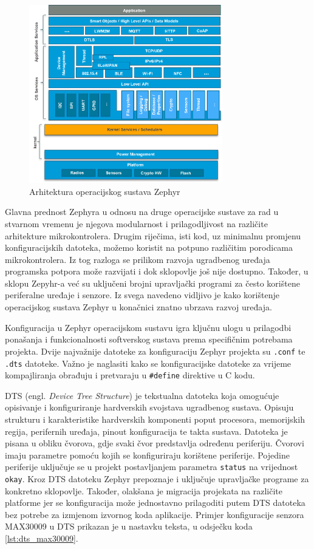 \documentclass[../diplomski_rad.tex]{subfiles}
\begin{document}
\begin{figure}[htb]
    \centering
    \includegraphics[width=0.75\textwidth]{Figures/zephyr.png} 
    \caption{Arhitektura operacijskog sustava Zephyr \cite{zephyr}}
    \label{slk:zephyr}
\end{figure}

Glavna prednost Zephyra u odnosu na druge operacijske sustave za rad u stvarnom vremenu je njegova 
modularnost i prilagodljivost na različite arhitekture mikrokontrolera. 
Drugim riječima, isti kod, uz minimalnu promjenu konfiguracijskih datoteka, možemo koristit na potpuno 
različitim porodicama mikrokontrolera. Iz tog razloga se prilikom razvoja ugradbenog uređaja programska 
potpora može razvijati i dok sklopovlje još nije dostupno.
Također, u sklopu Zepyhr-a već su uključeni brojni upravljački programi za često korištene periferalne 
uređaje i senzore. 
Iz svega navedeno vidljivo je kako korištenje operacijskog sustava Zephyr u konačnici 
znatno ubrzava razvoj uređaja.

Konfiguracija u Zephyr operacijskom sustavu igra ključnu ulogu u prilagodbi ponašanja i funkcionalnosti 
softverskog sustava prema specifičnim potrebama projekta.
Dvije najvažnije datoteke za konfiguraciju Zephyr projekta su \texttt{.conf} te \texttt{.dts} datoteke. 
Važno je naglasiti kako se konfiguracijske datoteke za vrijeme kompajliranja obrađuju i pretvaraju u 
\texttt{\#define} direktive u C kodu. 

DTS (engl. \textit{Device Tree Structure}) je tekstualna datoteka koja
omogućuje opisivanje i konfiguriranje hardverskih svojstava ugradbenog sustava.
Opisuju strukturu i karakteristike hardverskih komponenti poput procesora, 
memorijskih regija, perifernih uređaja, pinout konfiguracija te takta sustava.
Datoteka je pisana u obliku čvorova, gdje svaki čvor predstavlja određenu periferiju. 
Čvorovi imaju parametre pomoću kojih se konfiguriraju korištene periferije.  
Pojedine periferije uključuje se u projekt postavljanjem parametra \texttt{status} na vrijednost \texttt{okay}.
Kroz DTS datoteku Zephyr prepoznaje i uključuje upravljačke programe za konkretno sklopovlje. 
Također, olakšana je migracija projekata na različite platforme jer se konfiguracija može jednostavno 
prilagoditi putem DTS datoteka bez potrebe za izmjenom izvornog koda aplikacije.
Primjer konfiguracije senzora MAX30009 u DTS prikazan je u nastavku teksta, u odsječku koda \ref{lst:dts_max30009}. 
\end{document}
